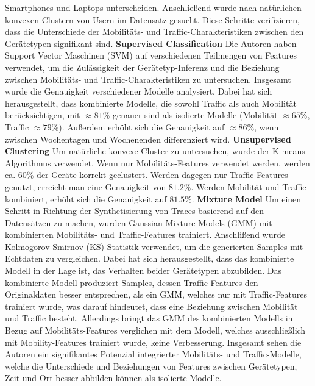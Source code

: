 \documentclass[12pt, a4paper]{article}
\begin{document}
Smartphones und Laptops unterscheiden. Anschließend wurde nach natürlichen konvexen Clustern von Usern im
Datensatz gesucht. Diese Schritte verifizieren, dass die Unterschiede der Mobilitäts- und Traffic-Charakteristiken
zwischen den Gerätetypen signifikant sind.
\newline\newline
\textbf{Supervised Classification}\newline
Die Autoren haben Support Vector Maschinen (SVM) auf verschiedenen Teilmengen von Features
verwendet, um die Zulässigkeit der Gerätetyp-Inferenz und die Beziehung zwischen Mobilitäts- und Traffic-Charakteristiken
zu untersuchen. Insgesamt wurde die Genauigkeit verschiedener Modelle analysiert. Dabei hat sich herausgestellt,
dass kombinierte Modelle, die sowohl Traffic als auch Mobilität berücksichtigen, mit $\approx 81 \%$ genauer sind als isolierte Modelle
(Mobilität $\approx 65 \%$, Traffic $\approx 79 \%$). Außerdem erhöht sich die Genauigkeit auf $\approx 86 \%$, wenn zwischen Wochentagen
und Wochenenden differenziert wird.
\newline\newline
\textbf{Unsupervised Clustering}\newline
Um natürliche konvexe Cluster zu untersuchen, wurde der K-means-Algorithmus verwendet.
Wenn nur Mobilitäts-Features verwendet werden, werden ca. $60 \%$ der Geräte korrekt geclustert.
Werden dagegen nur Traffic-Features genutzt, erreicht man eine Genauigkeit von $81.2 \%$.
Werden Mobilität und Traffic kombiniert, erhöht sich die Genauigkeit auf $81.5 \%$.
\newline\newline
\textbf{Mixture Model}\newline
Um einen Schritt in Richtung der Synthetisierung von Traces basierend auf den Datensätzen zu machen,
wurden Gaussian Mixture Models (GMM) mit kombinierten Mobilitäts- und Traffic-Features trainiert.
Anschlißend wurde Kolmogorov-Smirnov (KS) Statistik verwendet, um die generierten Samples mit Echtdaten zu vergleichen.
Dabei hat sich herausgestellt, dass das kombinierte Modell in der Lage ist, das Verhalten beider Gerätetypen abzubilden.
Das kombinierte Modell produziert Samples, dessen Traffic-Features den Originaldaten besser entsprechen, als ein GMM,
welches nur mit Traffic-Features trainiert wurde, was darauf hindeutet, dass eine Beziehung zwischen Mobilität und Traffic besteht.
Allerdings bringt das GMM des kombinierten Modells in Bezug auf Mobilitäts-Features verglichen mit dem Modell, welches 
ausschließlich mit Mobility-Features trainiert wurde, keine Verbesserung.
\newline\newline
Insgesamt sehen die Autoren ein signifikantes Potenzial integrierter Mobilitäts- und Traffic-Modelle, welche die Unterschiede
und Beziehungen von Features zwischen Gerätetypen, Zeit und Ort besser abbilden können als isolierte Modelle.
\end{document}
